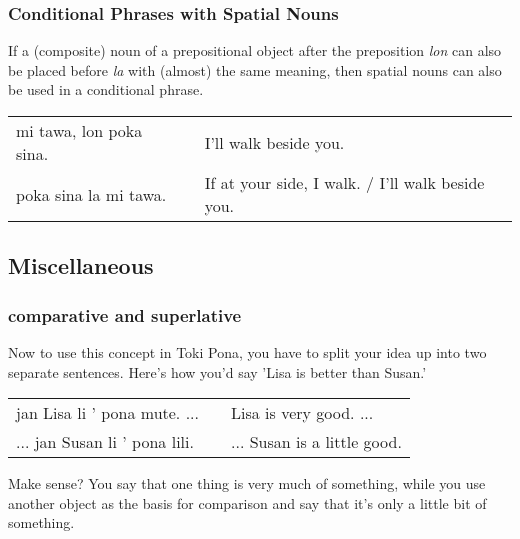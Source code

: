 %
%
\subsubsection*{Conditional Phrases with Spatial Nouns}
%
%

If a (composite) noun of a prepositional object after the preposition \textit{lon} can also be placed before \textit{la} with (almost) the same meaning, then spatial nouns can also be used in a conditional phrase. 

\begin{supertabular}{p{5,5cm}|ll}
mi tawa, lon poka sina.  && I'll walk beside you. \\
poka sina la mi tawa.    && If at your side, I walk. / I'll walk beside you.  \\
\end{supertabular} 

%
\subsection*{Miscellaneous}
%
%
\subsubsection*{comparative and superlative} 
%
%
Now to use this concept in Toki Pona, you have to split your idea up into two separate sentences. 
Here's how you'd say 'Lisa is better than Susan.'

\begin{supertabular}{p{5,5cm}|ll}
jan Lisa li ' pona mute. ...  && Lisa is very good. ... \\ %
... jan Susan li ' pona lili. && ... Susan is a little good. \\ %
\end{supertabular} 

Make sense? 
You say that one thing is very much of something, while you use another object as the basis for comparison and say that it's only a little bit of something. 

